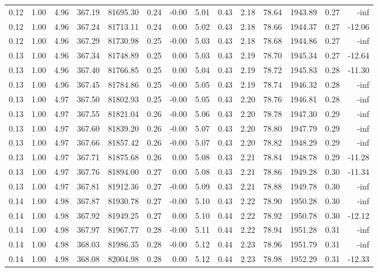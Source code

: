 \begin{table}[!ht]
\begin{tabular}{rrrrrrrrrrrrrr}
0.12 & 1.00 & 4.96 & 367.19 & 81695.30 & 0.24 & -0.00 & 5.01 & 0.43 & 2.18 & 78.64 & 1943.89 & 0.27 & -inf \\
0.12 & 1.00 & 4.96 & 367.24 & 81713.11 & 0.24 & 0.00 & 5.02 & 0.43 & 2.18 & 78.66 & 1944.37 & 0.27 & -12.06 \\
0.12 & 1.00 & 4.96 & 367.29 & 81730.98 & 0.25 & -0.00 & 5.03 & 0.43 & 2.18 & 78.68 & 1944.86 & 0.27 & -inf \\
0.13 & 1.00 & 4.96 & 367.34 & 81748.89 & 0.25 & 0.00 & 5.03 & 0.43 & 2.19 & 78.70 & 1945.34 & 0.27 & -12.64 \\
0.13 & 1.00 & 4.96 & 367.40 & 81766.85 & 0.25 & 0.00 & 5.04 & 0.43 & 2.19 & 78.72 & 1945.83 & 0.28 & -11.30 \\
0.13 & 1.00 & 4.96 & 367.45 & 81784.86 & 0.25 & -0.00 & 5.05 & 0.43 & 2.19 & 78.74 & 1946.32 & 0.28 & -inf \\
0.13 & 1.00 & 4.97 & 367.50 & 81802.93 & 0.25 & -0.00 & 5.05 & 0.43 & 2.20 & 78.76 & 1946.81 & 0.28 & -inf \\
0.13 & 1.00 & 4.97 & 367.55 & 81821.04 & 0.26 & -0.00 & 5.06 & 0.43 & 2.20 & 78.78 & 1947.30 & 0.29 & -inf \\
0.13 & 1.00 & 4.97 & 367.60 & 81839.20 & 0.26 & -0.00 & 5.07 & 0.43 & 2.20 & 78.80 & 1947.79 & 0.29 & -inf \\
0.13 & 1.00 & 4.97 & 367.66 & 81857.42 & 0.26 & -0.00 & 5.07 & 0.43 & 2.20 & 78.82 & 1948.29 & 0.29 & -inf \\
0.13 & 1.00 & 4.97 & 367.71 & 81875.68 & 0.26 & 0.00 & 5.08 & 0.43 & 2.21 & 78.84 & 1948.78 & 0.29 & -11.28 \\
0.13 & 1.00 & 4.97 & 367.76 & 81894.00 & 0.27 & 0.00 & 5.08 & 0.43 & 2.21 & 78.86 & 1949.28 & 0.30 & -11.34 \\
0.13 & 1.00 & 4.97 & 367.81 & 81912.36 & 0.27 & -0.00 & 5.09 & 0.43 & 2.21 & 78.88 & 1949.78 & 0.30 & -inf \\
0.14 & 1.00 & 4.98 & 367.87 & 81930.78 & 0.27 & -0.00 & 5.10 & 0.43 & 2.22 & 78.90 & 1950.28 & 0.30 & -inf \\
0.14 & 1.00 & 4.98 & 367.92 & 81949.25 & 0.27 & 0.00 & 5.10 & 0.44 & 2.22 & 78.92 & 1950.78 & 0.30 & -12.12 \\
0.14 & 1.00 & 4.98 & 367.97 & 81967.77 & 0.28 & -0.00 & 5.11 & 0.44 & 2.22 & 78.94 & 1951.28 & 0.31 & -inf \\
0.14 & 1.00 & 4.98 & 368.03 & 81986.35 & 0.28 & -0.00 & 5.12 & 0.44 & 2.23 & 78.96 & 1951.79 & 0.31 & -inf \\
0.14 & 1.00 & 4.98 & 368.08 & 82004.98 & 0.28 & 0.00 & 5.12 & 0.44 & 2.23 & 78.98 & 1952.29 & 0.31 & -12.33 \\

\end{tabular}
\end{table}
